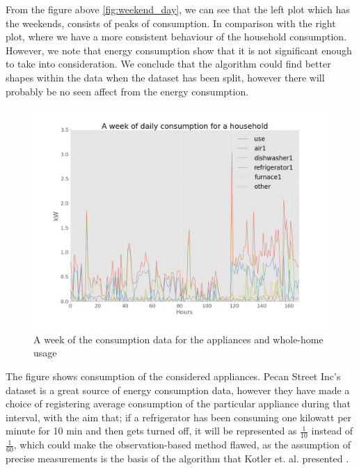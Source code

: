 From the figure above \ref{fig:weekend_day}, we can see that the left plot which has the weekends, consists of peaks of consumption. In comparison with the right plot, where we have a more consistent behaviour of the household consumption. However, we note that energy consumption show that it is not significant enough to take into consideration. We conclude that the algorithm could find better shapes within the data when the dataset has been split, however there will probably be no seen affect from the energy consumption.

\begin{figure}[H]
	\centering
	\includegraphics[scale=0.30]{./figures/weekconsump}
	\caption{A week of the consumption data for the appliances and whole-home usage}
	\label{fig:weekconsump}
\end{figure}

The figure shows consumption of the considered appliances. Pecan Street Inc's dataset is a great source of energy consumption data, however they have made a choice of registering average consumption of the particular appliance during that interval, with the aim that; if a refrigerator has been consuming one kilowatt per minute for 10 min and then gets turned off, it will be represented as $\frac{1}{10}$ instead of $\frac{1}{60}$, which could make the observation-based method flawed, as the assumption of precise measurements is the basis of the algorithm that Kotler et. al. presented \cite{DDSC}. 

